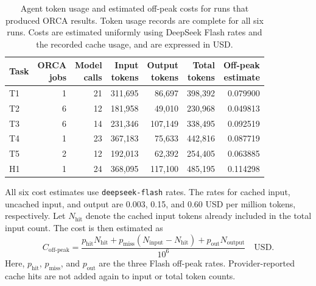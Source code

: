 \documentclass[a4paper,11pt]{article}
\newcommand{\code}[1]{\texttt{#1}}
\begin{document}
\begin{table}[H]
  \centering\small
  \setlength{\tabcolsep}{4pt}
  \caption{Agent token usage and estimated off-peak costs for runs that produced ORCA results.
  Token usage records are complete for all six runs.
  Costs are estimated uniformly using DeepSeek Flash rates and the recorded cache usage, and are expressed in USD.}
  \label{tab:token-cost}
  \begin{tabular*}{\linewidth}{@{\extracolsep{\fill}}lrrrrrr@{}}
    \toprule
    Task & \shortstack[r]{ORCA\\jobs} & \shortstack[r]{Model\\calls} & \shortstack[r]{Input\\tokens} & \shortstack[r]{Output\\tokens} & \shortstack[r]{Total\\tokens} & \shortstack[r]{Off-peak\\estimate}\\
    \midrule
    T1 & 1 & 21 & 311,695 & 86,697 & 398,392 & 0.079900\\
    T2 & 6 & 12 & 181,958 & 49,010 & 230,968 & 0.049813\\
    T3 & 6 & 14 & 231,346 & 107,149 & 338,495 & 0.092519\\
    T4 & 1 & 23 & 367,183 & 75,633 & 442,816 & 0.087719\\
    T5 & 2 & 12 & 192,013 & 62,392 & 254,405 & 0.063885\\
    H1 & 1 & 24 & 368,095 & 117,100 & 485,195 & 0.114298\\
    \bottomrule
  \end{tabular*}
\end{table}

All six cost estimates use \code{deepseek-flash} rates.
The rates for cached input, uncached input, and output are 0.003, 0.15, and 0.60 USD per million tokens, respectively.
Let $N_{\mathrm{hit}}$ denote the cached input tokens already included in the total input count.
The cost is then estimated as
\begin{equation}
  C_{\mathrm{off\text{-}peak}}=
  \frac{p_{\mathrm{hit}}N_{\mathrm{hit}}
  +p_{\mathrm{miss}}(N_{\mathrm{input}}-N_{\mathrm{hit}})
  +p_{\mathrm{out}}N_{\mathrm{output}}}{10^6}
  \quad\text{USD}.
  \label{eq:token-cost}
\end{equation}
Here, $p_{\mathrm{hit}}$, $p_{\mathrm{miss}}$, and $p_{\mathrm{out}}$ are the three Flash off-peak rates.
Provider-reported cache hits are not added again to input or total token counts.
\end{document}

